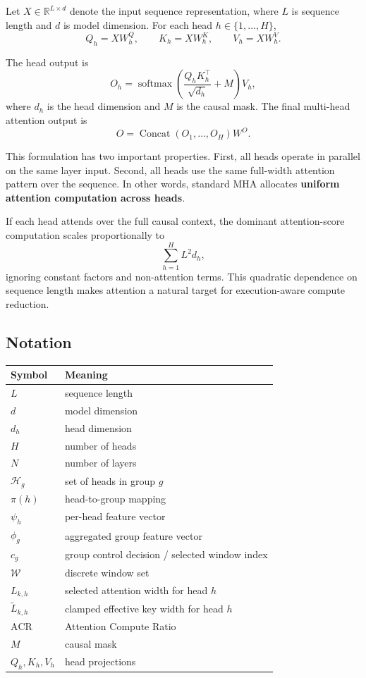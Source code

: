 \documentclass[11pt]{article}
\begin{document}
Let \(X \in \mathbb{R}^{L \times d}\) denote the input sequence representation, where \(L\) is sequence length and \(d\) is model dimension. For each head \(h \in \{1,\dots,H\}\),
\[
  Q_h = XW_h^Q,\qquad K_h = XW_h^K,\qquad V_h = XW_h^V.
\]

The head output is
\[
  O_h = \operatorname{softmax}\!\left(\frac{Q_hK_h^\top}{\sqrt{d_h}} + M\right)V_h,
\]
where \(d_h\) is the head dimension and \(M\) is the causal mask. The final multi-head attention output is
\[
  O = \operatorname{Concat}(O_1,\dots,O_H)W^O.
\]

This formulation has two important properties. First, all heads operate in parallel on the same layer input. Second, all heads use the same full-width attention pattern over the sequence. In other words, standard MHA allocates \textbf{uniform attention computation across heads}.

If each head attends over the full causal context, the dominant attention-score computation scales proportionally to
\[
  \sum_{h=1}^{H} L^2 d_h,
\]
ignoring constant factors and non-attention terms. This quadratic dependence on sequence length makes attention a natural target for execution-aware compute reduction.

\subsection*{Notation}

\begin{center}
  \begin{tabularx}{\textwidth}{>{\bfseries}l Y}
    \toprule
    Symbol & Meaning \\
    \midrule
    \(L\) & sequence length \\
    \(d\) & model dimension \\
    \(d_h\) & head dimension \\
    \(H\) & number of heads \\
    \(N\) & number of layers \\
    \(\mathcal H_g\) & set of heads in group \(g\) \\
    \(\pi(h)\) & head-to-group mapping \\
    \(\psi_h\) & per-head feature vector \\
    \(\phi_g\) & aggregated group feature vector \\
    \(c_g\) & group control decision / selected window index \\
    \(\mathcal W\) & discrete window set \\
    \(L_{k,h}\) & selected attention width for head \(h\) \\
    \(\tilde L_{k,h}\) & clamped effective key width for head \(h\) \\
    \(\mathrm{ACR}\) & Attention Compute Ratio \\
    \(M\) & causal mask \\
    \(Q_h,K_h,V_h\) & head projections \\
    \bottomrule
  \end{tabularx}
\end{center}
\end{document}
